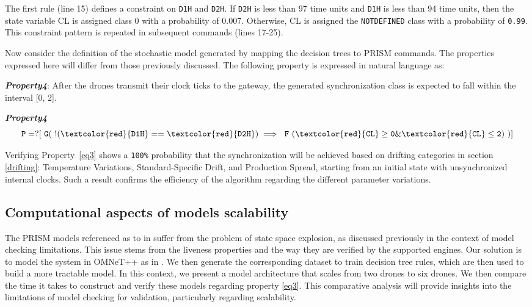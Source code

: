 The first rule (line 15) defines a constraint on \texttt{D1H} and \texttt{D2H}. If \texttt{D2H} is less than 97 time units and \texttt{D1H} is less than 94 time units, then the state variable CL is assigned class 0 with a probability of 0.007. Otherwise, CL is assigned the \texttt{NOTDEFINED} class with a probability of \texttt{0.99}. This constraint pattern is repeated in subsequent commands (lines 17-25).

Now consider the definition of the stochastic model generated by mapping the decision trees to PRISM commands. The properties expressed here will differ from those previously discussed. The following property is expressed in natural language as:


\begin{framed}
\emph{\bfseries{Property4}}: After the drones transmit their clock ticks to the gateway, the generated synchronization class is expected to fall within the interval [0, 2].
\end{framed}



	    \begin{resp}{\textbf{\textit{Property4}}}
        \begin{equation}
        \label{eq3}
         \mathtt{ P=? [ \ G( \ !(\textcolor{red}{D1H}==\textcolor{red}{D2H}) \implies \ F \ (\textcolor{red}{CL}\geq 0 \& \textcolor{red}{CL}\leq 2) \ ) ]} 
        \end{equation}
        \end{resp}
        \normalsize

Verifying Property~\ref{eq3} shows a \texttt{100\%} probability that the synchronization will be achieved based on drifting categories in section \ref{drifting}: Temperature Variations, Standard-Specific Drift, and Production Spread, starting from an initial state with unsynchronized internal clocks. Such a result confirms the efficiency of the algorithm regarding the different parameter variations.

\subsection{Computational aspects of models scalability}
The PRISM models referenced as  to  in \cite{csi2023} suffer from the problem of state space explosion, as discussed previously in the context of model checking limitations. This issue stems from the liveness properties and the way they are verified by the supported engines. Our solution is to model the system in OMNeT++ as  in \cite{csi2023}. We then generate the corresponding dataset to train decision tree rules, which are then used to build a more tractable model. In this context, we present a model architecture that scales from two drones to six drones. We then compare the time it takes to construct and verify these models regarding property \ref{eq3}. This comparative analysis will provide insights into the limitations of model checking for validation, particularly regarding scalability.


